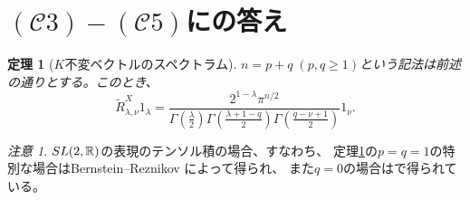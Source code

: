 \documentclass[notheorems]{beamer}
\newcommand{\tmop}[1]{\ensuremath{\operatorname{#1}}}
\newtheorem{theorem}{定理}
\theoremstyle{definition}
\theoremstyle{example}
\theoremstyle{remark}
\newtheorem*{remark}{注意}
\theoremstyle{mystyle}
\begin{document}
\section{$(\mathcal{C}3) - (\mathcal{C}5)$にの答え}
\begin{frame}
	\begin{theorem}[$K$不変ベクトルのスペクトラム]
		\label{thm:spherical}
	$n=p+q\;(p,q\ge1)$という記法は前述の通りとする。この{とき、}
	\begin{equation*}
		\tilde{R}_{\lambda, \nu}^X 1_{\lambda} =
\frac{2^{1 - \lambda} \pi^{n / 2}}{\Gamma \left( \frac{\lambda}{2} \right)
\Gamma \left( \frac{\lambda + 1 - q}{2} \right) \Gamma \left( \frac{q - \nu +
1}{2} \right)} 1_{\nu}.
	\end{equation*}
	\end{theorem}
	\begin{remark}
	$SL(2,\mathbb{R})$の表現のテンソル積の場合、すなわち、
	定理\ref{thm:spherical}\;の$p=q=1$の特別な場合はBernstein--Reznikov\cite[Lem. A.5]{bernstein2004estimates} によって得られ、
	また$q=0$の場合は\cite[Prop.\ 7.4]{kobayashi2015symmetry}で得られている。
	\end{remark}
\end{frame}
\end{document}
